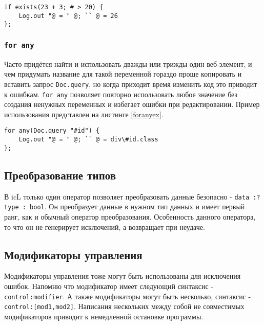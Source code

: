 \begin{sourcecode}
\label{ifexistsex}
\begin{verbatim}
if exists(23 + 3; # > 20) {
	Log.out "@ = " @; `` @ = 26
};
\end{verbatim}
\end{sourcecode}

\subsubsection{\texttt{for any}}

Часто придётся найти и использовать дважды или трижды один веб-элемент, и чем придумать название для такой переменной гораздо проще копировать и вставить запрос \texttt{Doc.query}, но когда приходит время изменить код это приводит к ошибкам. \texttt{for any} позволяет повторно использовать любое значение без создания ненужных переменных и избегает ошибки при редактировании. Пример использования представлен на листинге \ref{foranyex}.

\begin{sourcecode}
\label{foranyex}
\begin{verbatim}
for any(Doc.query "#id") {
	Log.out "@ = " @; `` @ = div\#id.class
};
\end{verbatim}
\end{sourcecode}

\subsection{Преобразование типов}

В icL только один оператор позволяет преобразовать данные безопасно - \texttt{data :? type : bool}.
Он преобразует данные в нужном тип данных и имеет первый ранг, как и обычный оператор преобразования. Особенность данного оператора, то что он не генерирует исключений, а возвращает \void{} при неудаче.

\subsection{Модификаторы управления}

Модификаторы управления тоже могут быть использованы для исключения ошибок. Напомню что модификатор имеет следующий синтаксис - \texttt{control:modifier}. А также модификаторы могут быть несколько, синтаксис - \texttt{control:[mod1,mod2]}. Написания нескольких между собой не совместимых модификаторов приводит к немедленной остановке программы.

